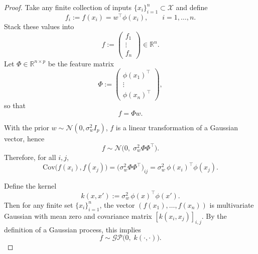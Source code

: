 \documentclass[../main]{subfiles}
\begin{document}
\begin{proof}
    Take any finite collection of inputs $\{x_i\}_{i=1}^n \subset \mathcal X$
    and define
    \begin{equation}
        f_i := f(x_i) = w^\top \phi(x_i),\qquad i=1,\dots,n.
    \end{equation}
    Stack these values into
    \begin{equation}
        f :=
        \begin{pmatrix}
            f_1\\
            \vdots\\
            f_n
        \end{pmatrix}
        \in \mathbb R^n.
    \end{equation}
    Let $\Phi \in \mathbb R^{n\times p}$ be the feature matrix
    \begin{equation}
        \Phi :=
        \begin{pmatrix}
            \phi(x_1)^\top\\
            \vdots\\
            \phi(x_n)^\top
        \end{pmatrix},
    \end{equation}
    so that
    \begin{equation}
        f = \Phi w.
    \end{equation}

    With the prior $w \sim \mathcal N(0,\sigma_w^2 I_p)$, $f$ is a linear
    transformation of a Gaussian vector, hence
    \begin{equation}
        f \sim \mathcal N\!\bigl(0,\; \sigma_w^2 \Phi \Phi^\top\bigr).
    \end{equation}
    Therefore, for all $i,j$,
    \begin{equation}
        \mathrm{Cov}\bigl(f(x_i), f(x_j)\bigr)
        = \bigl(\sigma_w^2 \Phi \Phi^\top\bigr)_{ij}
        = \sigma_w^2\, \phi(x_i)^\top \phi(x_j).
    \end{equation}

    Define the kernel
    \begin{equation}
        k(x,x') := \sigma_w^2\, \phi(x)^\top \phi(x').
    \end{equation}
    Then for any finite set $\{x_i\}_{i=1}^n$, the vector
    $(f(x_1),\dots,f(x_n))$ is multivariate Gaussian with mean zero and
    covariance matrix $[k(x_i,x_j)]_{i,j}$.  By the definition of a
    Gaussian process, this implies
    \begin{equation}
        f \sim \mathcal{GP}\!\bigl(0,\; k(\cdot,\cdot)\bigr).
    \end{equation}


\end{proof}
\end{document}
